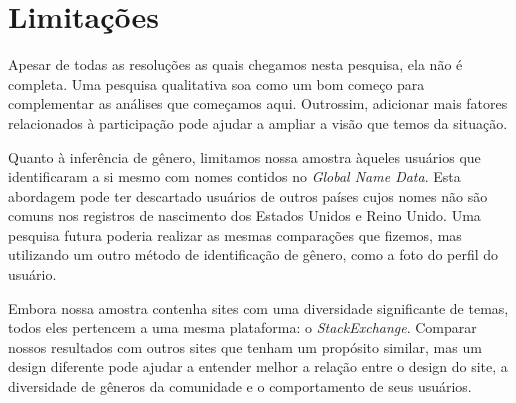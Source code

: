 
\chapter{Limitações}

Apesar de todas as resoluções as quais chegamos nesta pesquisa, ela não é completa. Uma pesquisa qualitativa soa como um bom começo para complementar as análises que começamos aqui. Outrossim, adicionar mais fatores relacionados à participação pode ajudar a ampliar a visão que temos da situação.


Quanto à inferência de gênero, limitamos nossa amostra àqueles usuários que identificaram a si mesmo com nomes contidos no \emph{Global Name Data}. Esta abordagem pode ter descartado usuários de outros países cujos nomes não são comuns nos registros de nascimento dos Estados Unidos e Reino Unido. Uma pesquisa futura poderia realizar as mesmas comparações que fizemos, mas utilizando um outro método de identificação de gênero, como a foto do perfil do usuário.


Embora nossa amostra contenha sites com uma diversidade significante de temas, todos eles pertencem a uma mesma plataforma: o \emph{StackExchange}. Comparar nossos resultados com outros sites que tenham um propósito similar, mas um design diferente pode ajudar a entender melhor a relação entre o design do site, a diversidade de gêneros da comunidade e o comportamento de seus usuários.

